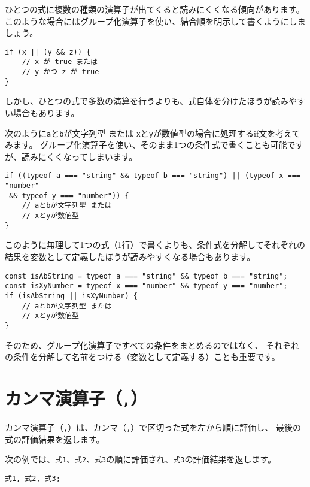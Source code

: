 ひとつの式に複数の種類の演算子が出てくると読みにくくなる傾向があります。
このような場合にはグループ化演算子を使い、結合順を明示して書くようにしましょう。

\begin{lstlisting}
if (x || (y && z)) {
    // x が true または
    // y かつ z が true
}
\end{lstlisting}

しかし、ひとつの式で多数の演算を行うよりも、式自体を分けたほうが読みやすい場合もあります。

次のように\texttt{a}と\texttt{b}が文字列型
または
\texttt{x}と\texttt{y}が数値型の場合に処理するif文を考えてみます。
グループ化演算子を使い、そのまま1つの条件式で書くことも可能ですが、読みにくくなってしまいます。

\begin{lstlisting}
if ((typeof a === "string" && typeof b === "string") || (typeof x === "number"
 && typeof y === "number")) {
    // aとbが文字列型 または
    // xとyが数値型
}
\end{lstlisting}

このように無理して1つの式（1行）で書くよりも、条件式を分解してそれぞれの結果を変数として定義したほうが読みやすくなる場合もあります。

\begin{lstlisting}
const isAbString = typeof a === "string" && typeof b === "string";
const isXyNumber = typeof x === "number" && typeof y === "number";
if (isAbString || isXyNumber) {
    // aとbが文字列型 または
    // xとyが数値型
}
\end{lstlisting}

そのため、グループ化演算子ですべての条件をまとめるのではなく、
それぞれの条件を分解して名前をつける（変数として定義する）ことも重要です。

\hypertarget{comma-operator}{%
\section{\texorpdfstring{カンマ演算子（\texttt{,}）}{カンマ演算子（,）}}\label{comma-operator}}

カンマ演算子（\texttt{,}）は、カンマ（\texttt{,}）で区切った式を左から順に評価し、
最後の式の評価結果を返します。

次の例では、\texttt{式1}、\texttt{式2}、\texttt{式3}の順に評価され、\texttt{式3}の評価結果を返します。

\begin{lstlisting}
式1, 式2, 式3;
\end{lstlisting}

